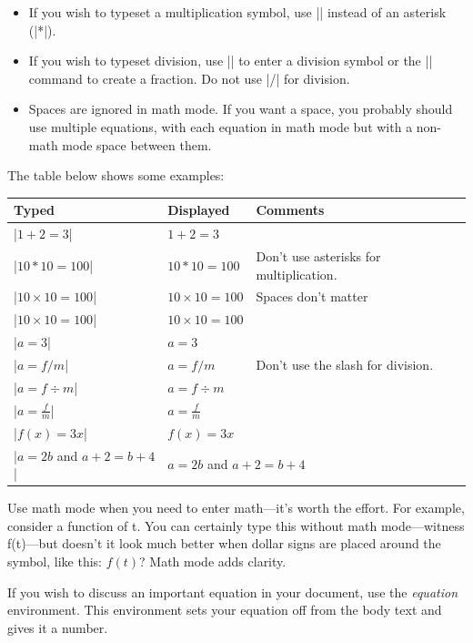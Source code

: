 \begin{itemize}
\item If you wish to typeset a multiplication symbol, use |\times| instead
of an asterisk (|*|).
\item If you wish to typeset division, use |\div| to enter a division
  symbol or the |\frac| command to create a fraction. Do not use |/|
  for division. 
\item Spaces are ignored in math mode. If you want a space, you
  probably should use multiple equations, with each equation
  in math mode but with a non-math mode space between them.
\end{itemize}

The table below shows some examples:

\begin{center}
\begin{tabular}{l|l|l}
Typed                   & Displayed & Comments \\\hline
|$1+2=3$|               & $1+2=3$ \\
|$10 * 10 = 100$|       & $10 * 10 = 100$  & {\small Don't use asterisks for multiplication.}\\
|$10\times10=100$|      & $10\times10=100$ & Spaces don't matter\\
|$10  \times  10  =  100$|      & $10  \times  10  =  100$\\
|$a=3$|                 & $a=3$\\
|$a=f/m$|               & $a=f/m$ & {\small Don't use the slash for division.}\\
|$a=f \div m$|          & $a=f \div m$\\
|$a=\frac{f}{m}$|       & $a=\frac{f}{m}$\\
|$f(x)=3x$|             & $f(x)=3x$\\
|$a=2b$ and $a+2=b+4$|  & \multicolumn{2}{l}{$a=2b$ and $a+2=b+4$}\\
\end{tabular}
\end{center}

Use math mode when you need to enter math---it's worth the effort. For example, consider a function of t. You can certainly type this
without math mode---witness f(t)---but doesn't it look much better
when dollar signs are placed around the symbol, like this: $f(t)$? Math
mode adds clarity.

If you wish to discuss an important equation in your document,
use the \emph{equation}
environment.  This environment sets your equation off from the body
text and gives it a number.

